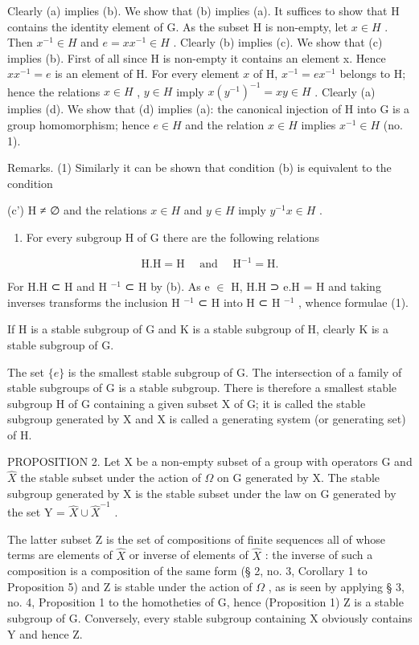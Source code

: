 Clearly (a) implies (b). We show that (b) implies (a). It suffices to show that H contains the identity element of G. As the subset H is non-empty, let \(x \in H\) . Then \(x^{-1} \in H\) and \(e = xx^{-1} \in H\) . Clearly (b) implies (c). We show that (c) implies (b). First of all since H is non-empty it contains an element x. Hence \(xx^{-1} = e\) is an element of H. For every element \(x\) of H, \(x^{-1} = ex^{-1}\) belongs to H; hence the relations \(x \in H\) , \(y \in H\) imply \(x(y^{-1})^{-1} = xy \in H\) . Clearly (a) implies (d). We show that (d) implies (a): the canonical injection of H into G is a group homomorphism; hence \(e \in H\) and the relation \(x \in H\) implies \(x^{-1} \in H\) (no. 1).

Remarks. (1) Similarly it can be shown that condition (b) is equivalent to the condition

(c') H ≠ ∅ and the relations \(x \in H\) and \(y \in H\) imply \(y^{-1}x \in H\) .

\begin{enumerate}
\def\labelenumi{(\arabic{enumi})}
\setcounter{enumi}{1}
\tightlist
\item
  For every subgroup H of G there are the following relations
\end{enumerate}

\[
\mathrm{H.H} = \mathrm{H} \quad \text { and } \quad \mathrm{H} ^ {- 1} = \mathrm{H}.\tag{1}
\]

For H.H ⊂ H and H \(^{-1}\) ⊂ H by (b). As e \ensuremath{\in} H, H.H ⊃ e.H = H and taking inverses transforms the inclusion H \(^{-1}\) ⊂ H into H ⊂ H \(^{-1}\) , whence formulae (1).

If H is a stable subgroup of G and K is a stable subgroup of H, clearly K is a stable subgroup of G.

The set \(\{e\}\) is the smallest stable subgroup of G. The intersection of a family of stable subgroups of G is a stable subgroup. There is therefore a smallest stable subgroup H of G containing a given subset X of G; it is called the stable subgroup generated by X and X is called a generating system (or generating set) of H.

PROPOSITION 2. Let X be a non-empty subset of a group with operators G and \(\hat{X}\) the stable subset under the action of \(\Omega\) on G generated by X. The stable subgroup generated by X is the stable subset under the law on G generated by the set Y = \(\hat{X} \cup \hat{X}^{-1}\) .

The latter subset Z is the set of compositions of finite sequences all of whose terms are elements of \(\hat{X}\) or inverse of elements of \(\hat{X}\) : the inverse of such a composition is a composition of the same form (§ 2, no. 3, Corollary 1 to Proposition 5) and Z is stable under the action of \(\Omega\) , as is seen by applying § 3, no. 4, Proposition 1 to the homotheties of G, hence (Proposition 1) Z is a stable subgroup of G. Conversely, every stable subgroup containing X obviously contains Y and hence Z.

